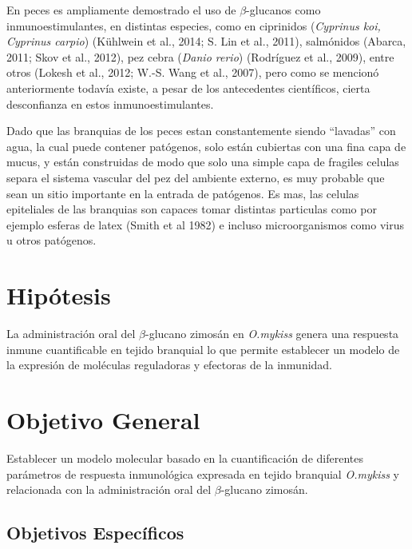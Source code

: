 \documentclass[12pt,a4paper,oneside]{scrbook}
\begin{document}
En peces es ampliamente demostrado el uso de $\beta$-glucanos como
inmunoestimulantes, en distintas especies, como en ciprinidos
(\emph{Cyprinus koi, Cyprinus carpio}) (Kühlwein et al., 2014; S. Lin et
al., 2011)⁠, salmónidos (Abarca, 2011; Skov et al., 2012)⁠, pez cebra
(\emph{Danio rerio}) (Rodríguez et al., 2009), entre otros (Lokesh et
al., 2012; W.-S. Wang et al., 2007), pero como se mencionó anteriormente
todavía existe, a pesar de los antecedentes científicos, cierta
desconfianza en estos inmunoestimulantes.

Dado que las branquias de los peces estan constantemente siendo
``lavadas'' con agua, la cual puede contener patógenos, solo están
cubiertas con una fina capa de mucus, y están construidas de modo que
solo una simple capa de fragiles celulas separa el sistema vascular del
pez del ambiente externo, es muy probable que sean un sitio importante
en la entrada de patógenos. Es mas, las celulas epiteliales de las
branquias son capaces tomar distintas particulas como por ejemplo
esferas de latex (Smith et al 1982) e incluso microorganismos como virus
u otros patógenos.

\chapter{Hipótesis}

La administración oral del $\beta$-glucano zimosán en \emph{O.mykiss}
genera una respuesta inmune cuantificable en tejido branquial lo que
permite establecer un modelo de la expresión de moléculas reguladoras y
efectoras de la inmunidad.

\chapter{Objetivo General}

Establecer un modelo molecular basado en la cuantificación de diferentes
parámetros de respuesta inmunológica expresada en tejido branquial
\emph{O.mykiss} y relacionada con la administración oral del
$\beta$-glucano zimosán.

\section{Objetivos Específicos}
\end{document}
